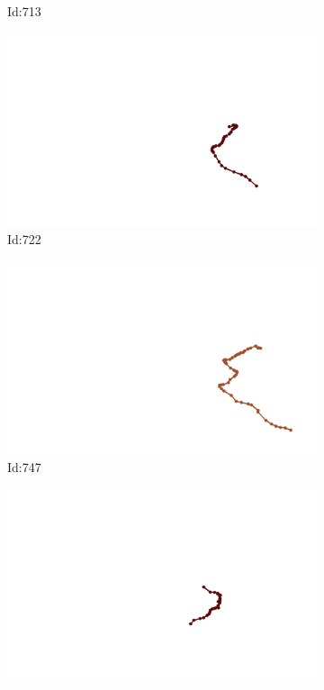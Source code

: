 \documentclass[12pt,twoside]{report}
\begin{document}
\begin{figure}
\begin{subfigure}[b]{0.20\textwidth}
\caption{Id:713}
\end{subfigure}
\begin{subfigure}[b]{0.20\textwidth}
\centering
\includegraphics[width=\textwidth]{../trajectories/722.png}
\caption{Id:722}
\end{subfigure}
\begin{subfigure}[b]{0.20\textwidth}
\centering
\includegraphics[width=\textwidth]{../trajectories/747.png}
\caption{Id:747}
\end{subfigure}
\begin{subfigure}[b]{0.20\textwidth}
\centering
\includegraphics[width=\textwidth]{../trajectories/750.png}

\end{subfigure}
\end{figure}
\end{document}
